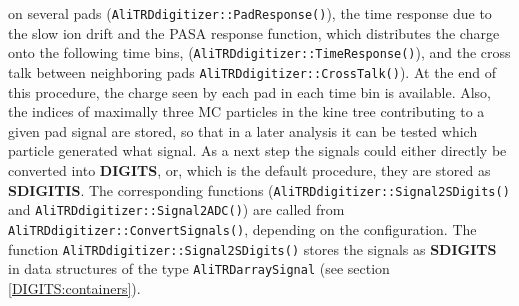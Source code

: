 \documentclass{alicetdr}
\begin{document}
on several pads ({\tt AliTRDdigitizer::PadResponse()}), the time response due
to the slow ion drift and the PASA response function, which distributes the
charge onto the following time bins, ({\tt AliTRDdigitizer::TimeResponse()}),
and the cross talk between neighboring pads {\tt AliTRD\-digitizer::CrossTalk()}).
At the end of this procedure, the charge seen by each pad in each time bin
is available.  Also, the indices of maximally three MC particles in the kine
tree contributing to a given pad signal are stored, so that in a later
analysis it can be tested which particle generated what signal.
As a next step the signals could either directly be converted into {\bf DIGITS},
or, which is the default procedure, they are stored as {\bf SDIGITIS}.
The corresponding functions ({\tt AliTRDdigitizer::Signal2SDigits()} and
{\tt AliTRDdigitizer::Signal2ADC()}) are called from
{\tt AliTRDdigitizer::ConvertSignals()}, depending on the configuration.
The function {\tt AliTRDdigitizer::Signal2SDigits()} stores the signals as
{\bf SDIGITS} in data structures of the type {\tt AliTRDarraySignal} (see
section \ref{DIGITS:containers}).
\end{document}

